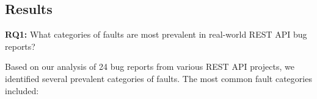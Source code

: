 \documentclass[conference]{IEEEtran}
\begin{document}
    
    


\subsection{Results}
\label{sec:results}

\textbf{RQ1:} What categories of faults are most prevalent in real-world REST API bug reports?

Based on our analysis of 24 bug reports from various REST API projects, we identified several prevalent categories of faults. The most common fault categories included:
\end{document}
